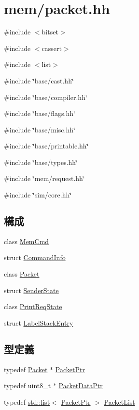 \hypertarget{packet_8hh}{
\section{mem/packet.hh}
\label{packet_8hh}
}
{\ttfamily \#include $<$bitset$>$}\par
{\ttfamily \#include $<$cassert$>$}\par
{\ttfamily \#include $<$list$>$}\par
{\ttfamily \#include \char`\"{}base/cast.hh\char`\"{}}\par
{\ttfamily \#include \char`\"{}base/compiler.hh\char`\"{}}\par
{\ttfamily \#include \char`\"{}base/flags.hh\char`\"{}}\par
{\ttfamily \#include \char`\"{}base/misc.hh\char`\"{}}\par
{\ttfamily \#include \char`\"{}base/printable.hh\char`\"{}}\par
{\ttfamily \#include \char`\"{}base/types.hh\char`\"{}}\par
{\ttfamily \#include \char`\"{}mem/request.hh\char`\"{}}\par
{\ttfamily \#include \char`\"{}sim/core.hh\char`\"{}}\par
\subsection*{構成}
\begin{DoxyCompactItemize}
\item 
class \hyperlink{classMemCmd}{MemCmd}
\item 
struct \hyperlink{structMemCmd_1_1CommandInfo}{CommandInfo}
\item 
class \hyperlink{classPacket}{Packet}
\item 
struct \hyperlink{structPacket_1_1SenderState}{SenderState}
\item 
class \hyperlink{classPacket_1_1PrintReqState}{PrintReqState}
\item 
struct \hyperlink{structPacket_1_1PrintReqState_1_1LabelStackEntry}{LabelStackEntry}
\end{DoxyCompactItemize}
\subsection*{型定義}
\begin{DoxyCompactItemize}
\item 
typedef \hyperlink{classPacket}{Packet} $\ast$ \hyperlink{packet_8hh_a470982fd720cbb1a92fc936965738abc}{PacketPtr}
\item 
typedef uint8\_\-t $\ast$ \hyperlink{packet_8hh_ae85a9de970f801a77a1ad88ee2b39ea2}{PacketDataPtr}
\item 
typedef \hyperlink{classstd_1_1list}{std::list}$<$ \hyperlink{classPacket}{PacketPtr} $>$ \hyperlink{packet_8hh_afda380bd563a3c5bf91ed82b01b1bd0a}{PacketList}
\end{DoxyCompactItemize}


